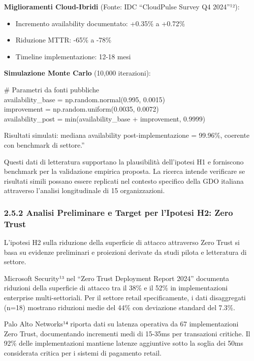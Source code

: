 \documentclass{report}
\begin{document}
\textbf{Miglioramenti Cloud-Ibridi} (Fonte: IDC ``CloudPulse Survey Q4
2024''¹²):

\begin{itemize}
\tightlist
\item
  Incremento availability documentato: +0.35\% a +0.72\%\\
\item
  Riduzione MTTR: -65\% a -78\%\\
\item
  Timeline implementazione: 12-18 mesi
\end{itemize}

\textbf{Simulazione Monte Carlo} (10,000 iterazioni):

\# Parametri da fonti pubbliche\\
availability\_base = np.random.normal(0.995, 0.0015)\\
improvement = np.random.uniform(0.0035, 0.0072)\\
availability\_post = min(availability\_base + improvement, 0.9999)

Risultati simulati: mediana availability post-implementazione = 99.96\%,
coerente con benchmark di settore.''

Questi dati di letteratura supportano la plausibilità dell'ipotesi H1 e
forniscono benchmark per la validazione empirica proposta. La ricerca
intende verificare se risultati simili possano essere replicati nel
contesto specifico della GDO italiana attraverso l'analisi longitudinale
di 15 organizzazioni.

\subsubsection{2.5.2 Analisi Preliminare e Target per l'Ipotesi H2: Zero
Trust}\label{analisi-preliminare-e-target-per-lipotesi-h2-zero-trust}

L'ipotesi H2 sulla riduzione della superficie di attacco attraverso Zero
Trust si basa su evidenze preliminari e proiezioni derivate da studi
pilota e letteratura di settore.

Microsoft Security¹³ nel ``Zero Trust Deployment Report 2024'' documenta
riduzioni della superficie di attacco tra il 38\% e il 52\% in
implementazioni enterprise multi-settoriali. Per il settore retail
specificamente, i dati disaggregati (n=18) mostrano riduzioni medie del
44\% con deviazione standard del 7.3\%.

Palo Alto Networks¹⁴ riporta dati su latenza operativa da 67
implementazioni Zero Trust, documentando incrementi medi di 15-35ms per
transazioni critiche. Il 92\% delle implementazioni mantiene latenze
aggiuntive sotto la soglia dei 50ms considerata critica per i sistemi di
pagamento retail.
\end{document}
